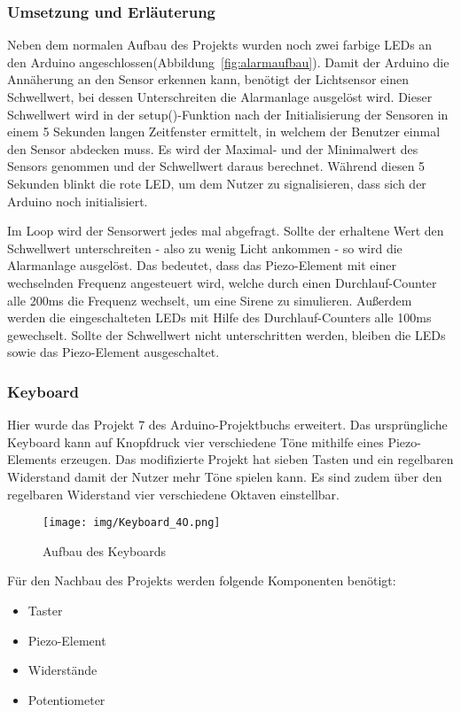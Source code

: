 \subsubsection{Umsetzung und Erläuterung}
Neben dem normalen Aufbau des Projekts wurden noch zwei farbige LEDs an den Arduino angeschlossen(Abbildung~\ref{fig:alarmaufbau}).
Damit der Arduino die Annäherung an den Sensor erkennen kann, benötigt der Lichtsensor einen Schwellwert, bei dessen Unterschreiten die Alarmanlage ausgelöst wird. Dieser Schwellwert wird in der setup()-Funktion nach der Initialisierung der Sensoren in einem 5 Sekunden langen Zeitfenster ermittelt, in welchem der Benutzer einmal den Sensor abdecken muss. Es wird der Maximal- und der Minimalwert des Sensors genommen und der Schwellwert daraus berechnet. Während diesen 5 Sekunden blinkt die rote LED, um dem Nutzer zu signalisieren, dass sich der Arduino noch initialisiert.

Im Loop wird der Sensorwert jedes mal abgefragt. Sollte der erhaltene Wert den Schwellwert unterschreiten - also zu wenig Licht ankommen - so wird die Alarmanlage ausgelöst. Das bedeutet, dass das Piezo-Element mit einer wechselnden Frequenz angesteuert wird, welche durch einen Durchlauf-Counter alle 200ms die Frequenz wechselt, um eine Sirene zu simulieren. Außerdem werden die eingeschalteten LEDs mit Hilfe des Durchlauf-Counters alle 100ms gewechselt.
Sollte der Schwellwert nicht unterschritten werden, bleiben die LEDs sowie das Piezo-Element ausgeschaltet.

\subsubsection{Keyboard}
Hier wurde das Projekt 7 des Arduino-Projektbuchs erweitert\parencite{arduino}. Das ursprüngliche Keyboard kann auf Knopfdruck vier verschiedene Töne mithilfe eines Piezo-Elements erzeugen. Das modifizierte Projekt hat sieben Tasten und ein regelbaren Widerstand
damit der Nutzer mehr Töne spielen kann. Es sind zudem über den regelbaren Widerstand vier verschiedene Oktaven einstellbar.

\begin{figure}[h]
\begin{center}
\texttt{[image: img/Keyboard\_4O.png]}
\caption{Aufbau des Keyboards}
\label{kb_aufbau}
\end{center}
\end{figure}

Für den Nachbau des Projekts werden folgende Komponenten benötigt:
\begin{itemize}
\item{Taster}
\item{Piezo-Element}
\item{Widerstände}
\item{Potentiometer}
\end{itemize}

